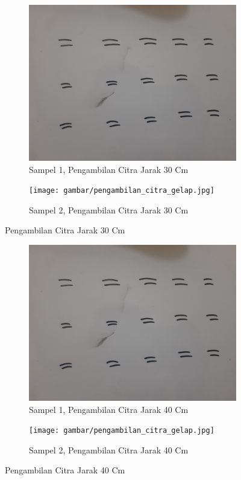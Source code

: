 \begin{figure}[H]
  \begin{subfigure}{.5\textwidth}
    \centering
    \captionsetup{width=.8\linewidth}
    \includegraphics[width=.85\linewidth]{gambar/pengambilan_citra_terang.jpg}
    \caption{Sampel 1, Pengambilan Citra Jarak 30 Cm}
    \label{fig:citra130cm}
  \end{subfigure}%
  \begin{subfigure}{.5\textwidth}
    \centering
    \captionsetup{width=.8\linewidth}
    \texttt{[image: gambar/pengambilan\_citra\_gelap.jpg]}
    \caption{Sampel 2, Pengambilan Citra Jarak 30 Cm}
    \label{fig:citra230cm}
  \end{subfigure}
  \caption{Pengambilan Citra Jarak 30 Cm}
  \label{fig:citra30cm}
\end{figure}

\begin{figure}[H]
  \begin{subfigure}{.5\textwidth}
    \centering
    \captionsetup{width=.8\linewidth}
    \includegraphics[width=.85\linewidth]{gambar/pengambilan_citra_terang.jpg}
    \caption{Sampel 1, Pengambilan Citra Jarak 40 Cm}
    \label{fig:citra140cm}
  \end{subfigure}%
  \begin{subfigure}{.5\textwidth}
    \centering
    \captionsetup{width=.8\linewidth}
    \texttt{[image: gambar/pengambilan\_citra\_gelap.jpg]}
    \caption{Sampel 2, Pengambilan Citra Jarak 40 Cm}
    \label{fig:citra240cm}
  \end{subfigure}
  \caption{Pengambilan Citra Jarak 40 Cm}
  \label{fig:citra40cm}
\end{figure}

